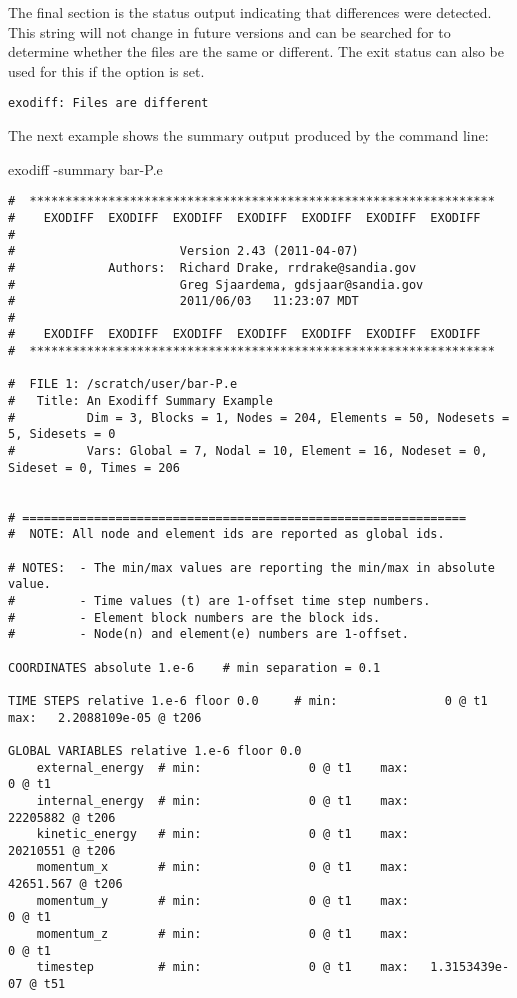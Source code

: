 \sectionline
The final section is the status output indicating that differences
were detected.  This string will not change in future versions and can
be searched for to determine whether the files are the same or
different.  The \exodiff{} exit status can also be used for this if
the  option is set.

\begin{verbatim}
exodiff: Files are different
\end{verbatim}
\sectionline
The next example shows the summary output produced by the command
line:
\begin{syntax}
exodiff -summary bar-P.e
\end{syntax}
\begin{verbatim}
#  *****************************************************************
#    EXODIFF  EXODIFF  EXODIFF  EXODIFF  EXODIFF  EXODIFF  EXODIFF  
#                                                                   
#                       Version 2.43 (2011-04-07)
#             Authors:  Richard Drake, rrdrake@sandia.gov           
#                       Greg Sjaardema, gdsjaar@sandia.gov          
#                       2011/06/03   11:23:07 MDT
#                                                                   
#    EXODIFF  EXODIFF  EXODIFF  EXODIFF  EXODIFF  EXODIFF  EXODIFF  
#  *****************************************************************

#  FILE 1: /scratch/user/bar-P.e
#   Title: An Exodiff Summary Example
#          Dim = 3, Blocks = 1, Nodes = 204, Elements = 50, Nodesets = 5, Sidesets = 0
#          Vars: Global = 7, Nodal = 10, Element = 16, Nodeset = 0, Sideset = 0, Times = 206


# ==============================================================
#  NOTE: All node and element ids are reported as global ids.

# NOTES:  - The min/max values are reporting the min/max in absolute value.
#         - Time values (t) are 1-offset time step numbers.
#         - Element block numbers are the block ids.
#         - Node(n) and element(e) numbers are 1-offset.

COORDINATES absolute 1.e-6    # min separation = 0.1

TIME STEPS relative 1.e-6 floor 0.0     # min:               0 @ t1 max:   2.2088109e-05 @ t206

GLOBAL VARIABLES relative 1.e-6 floor 0.0
	external_energy  # min:               0 @ t1	max:               0 @ t1
	internal_energy  # min:               0 @ t1	max:        22205882 @ t206
	kinetic_energy   # min:               0 @ t1	max:        20210551 @ t206
	momentum_x       # min:               0 @ t1	max:       42651.567 @ t206
	momentum_y       # min:               0 @ t1	max:               0 @ t1
	momentum_z       # min:               0 @ t1	max:               0 @ t1
	timestep         # min:               0 @ t1	max:   1.3153439e-07 @ t51


\end{verbatim}
